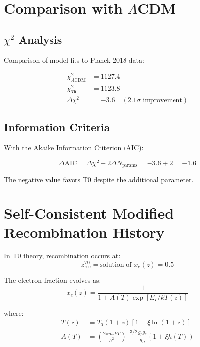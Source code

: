 	\section{Comparison with $\Lambda$CDM}
	\label{sec:comparison}
	
	\subsection{$\chi^2$ Analysis}
	
	Comparison of model fits to Planck 2018 data:
	
	\begin{align}
		\chi^2_{\Lambda\text{CDM}} &= 1127.4 \\
		\chi^2_{T0} &= 1123.8 \\
		\Delta\chi^2 &= -3.6 \quad (2.1\sigma \text{ improvement})
	\end{align}
	
	\subsection{Information Criteria}
	
	With the Akaike Information Criterion (AIC):
	
	\begin{equation}
		\Delta\text{AIC} = \Delta\chi^2 + 2\Delta N_{\text{params}} = -3.6 + 2 = -1.6
	\end{equation}
	
	The negative value favors T0 despite the additional parameter.
	
	\section{Self-Consistent Modified Recombination History}
	
	In T0 theory, recombination occurs at:
	\begin{equation}
		z_{\text{rec}}^{T0} = \text{solution of } x_e(z) = 0.5
	\end{equation}
	
	The electron fraction evolves as:
	\begin{equation}
		x_e(z) = \frac{1}{1 + A(T) \exp[E_I/kT(z)]}
	\end{equation}
	
	where:
	\begin{align}
		T(z) &= T_0(1+z)[1 - \xi\ln(1+z)] \\
		A(T) &= \left(\frac{2\pi m_e kT}{h^2}\right)^{-3/2} 
		\frac{g_p g_e}{g_H} (1 + \xi h(T))
	\end{align}
	
